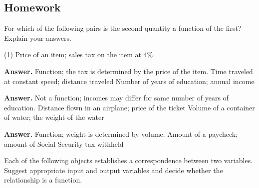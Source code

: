 \documentclass[10pt,]{book}
\theoremstyle{plain}
\theoremstyle{definition}
\theoremstyle{definition}
\theoremstyle{definition}
\begin{document}
\subsection[{Homework}]{Homework}\label{section-1-2-exercises}
\hypertarget{exercisegroup-1}{}\par\noindent For which of the following pairs is the second quantity a function of the first? Explain your answers.%
\begin{exercisegroup}(1)
\exercise[1.]\hypertarget{exercise-11}{}Price of an item; sales tax on the item at 4\%%
\par\smallskip
\noindent\textbf{Answer.}\hypertarget{answer-11}{}\quad
Function; the tax is determined by the price of the item.%
\exercise[2.]\hypertarget{exercise-12}{}Time traveled at constant speed; distance traveled%
\exercise[3.]\hypertarget{exercise-13}{}Number of years of education; annual income%
\par\smallskip
\noindent\textbf{Answer.}\hypertarget{answer-12}{}\quad
Not a function; incomes may differ for same number of years of education.%
\exercise[4.]\hypertarget{exercise-14}{}Distance flown in an airplane; price of the ticket%
\exercise[5.]\hypertarget{exercise-15}{}Volume of a container of water; the weight of the water%
\par\smallskip
\noindent\textbf{Answer.}\hypertarget{answer-13}{}\quad
Function; weight is determined by volume.%
\exercise[6.]\hypertarget{exercise-16}{}Amount of a paycheck; amount of Social Security tax withheld%
\end{exercisegroup}
\par\smallskip\noindent
\hypertarget{exercisegroup-2}{}\par\noindent Each of the following objects establishes a correspondence between two variables. Suggest appropriate input and output variables and decide whether the relationship is a function.%
\end{document}
